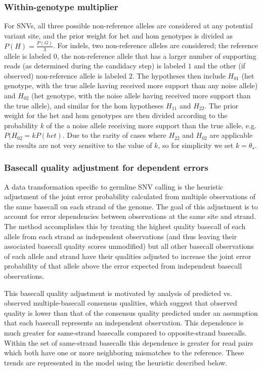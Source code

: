 \documentclass{article}
\begin{document}
\subsubsection{Within-genotype multiplier}
For SNVs, all three possible non-reference alleles are considered at any potential variant site, and the prior weight for het and hom genotypes is divided as $P(H) = \frac{P(G)}{3}$. For indels, two non-reference alleles are considered; the reference allele is labeled $0$, the non-reference allele that has a larger number of supporting reads (as determined during the candidacy step) is labeled $1$ and the other (if observed) non-reference allele is labeled $2$. The hypotheses then include $H_{01}$ (het genotype, with the true allele having received more support than any noise allele) and $H_{02}$ (het genotype, with the noise allele having received more support than the true allele), and similar for the hom hypotheses $H_{11}$ and $H_{22}$. The prior weight for the het and hom genotypes are then divided according to the probability $k$ of the a noise allele receiving more support than the true allele, e.g. $P(H_{02} = kP(het)$. Due to the rarity of cases where $H_{22}$ and $H_{02}$ are applicable the results are not very sensitive to the value of $k$, so for simplicity we set $k=\theta_s$.


\subsubsection{Basecall quality adjustment for dependent errors}
\label{sec:DepSiteErrorAdjustment}

A data transformation specific to germline SNV calling is the heuristic adjustment of the joint error probability calculated from multiple observations of the same basecall on each strand of the genome. The goal of this adjustment is to account for error dependencies between observations at the same site and strand. The method accomplishes this by treating the highest quality basecall of each allele from each strand as independent observations (and thus leaving their associated basecall quality scores unmodified) but all other basecall observations of each allele and strand have their qualities adjusted to increase the joint error probability of that allele above the error expected from independent basecall observations.

This basecall quality adjustment is motivated by analysis of predicted vs. observed multiple-basecall consensus qualities, which suggest that observed quality is lower than that of the consensus quality predicted under an assumption that each basecall represents an independent observation. This dependence is much greater for same-strand basecalls compared to opposite-strand basecalls. Within the set of same-strand basecalls this dependence is greater for read pairs which both have one or more neighboring mismatches to the reference. These trends are represented in the model using the heuristic described below.
\end{document}
